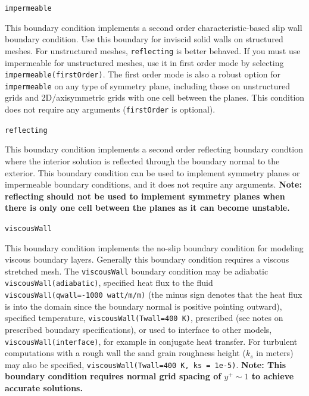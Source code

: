 \documentclass{article}
\begin{document}
\begin{list}{}{}
  \item {\tt impermeable}

    This boundary condition implements a second order
    characteristic-based slip wall boundary condition.  Use this
    boundary for inviscid solid walls on structured meshes.  For
    unstructured meshes, {\tt reflecting} is better behaved.  If you
    must use impermeable for unstructured meshes, use it in first
    order mode by selecting {\tt impermeable(firstOrder)}.  The first
    order mode is also a robust option for {\tt impermeable} on any
    type of symmetry plane, including those on unstructured grids and
    2D/axisymmetric grids with one cell between the planes.  This
    condition does not require any arguments ({\tt firstOrder} is
    optional).

  \item {\tt reflecting}

    This boundary condition implements a second order reflecting
    boundary condtion where the interior solution is reflected through
    the boundary normal to the exterior.  This boundary condition can
    be used to implement symmetry planes or impermeable boundary
    conditions, and it does not require any arguments.
    {\bf Note: reflecting should not be used to implement symmetry
    planes when there is only one cell between the planes as it can become
    unstable.}

  \item {\tt viscousWall}

    {\sloppy 
    This boundary condition implements the no-slip boundary condition
    for modeling viscous boundary layers.  Generally this boundary
    condition requires a viscous stretched mesh.  The {\tt viscousWall}
    boundary condition may be adiabatic {\tt viscousWall(adiabatic)},
    specified heat flux to the fluid {\tt viscousWall(qwall=-1000 watt/m/m)}
    (the minus sign denotes that the heat flux is into the domain since the
    boundary normal is positive pointing outward),
    specified temperature, {\tt viscousWall(Twall=400 K)}, prescribed (see notes
    on prescribed boundary specifications), or used to
    interface to other models, {\tt viscousWall(interface)}, for
    example in conjugate heat transfer.  For turbulent computations with a rough wall
    the sand grain roughness height ($k_s$ in meters) may also be specified,
    {\tt viscousWall(Twall=400 K, ks = 1e-5)}.
    {\bf Note: This boundary condition requires normal grid spacing of $y^+ \sim 1$ to
    achieve accurate solutions.}
}
                               

\end{list}
\end{document}
